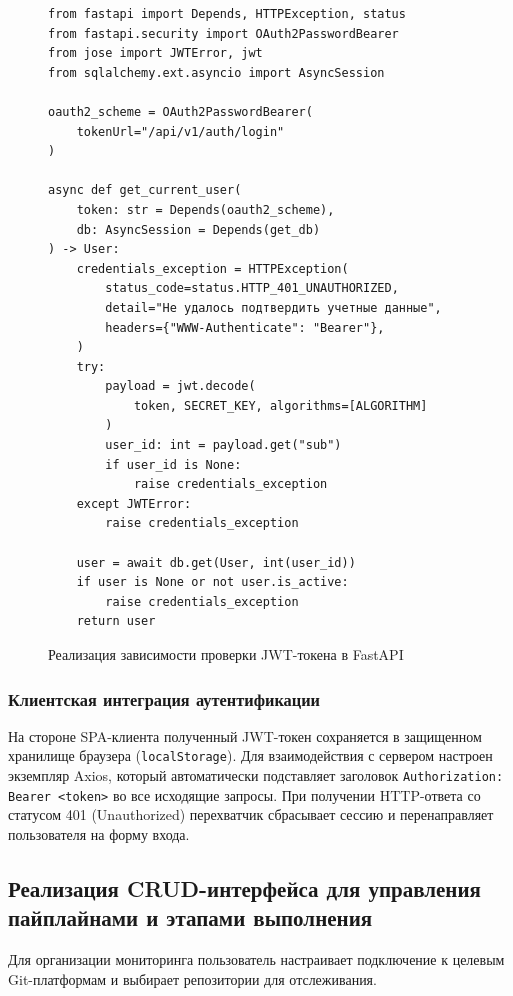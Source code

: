 \begin{figure}[H]
\centering
\begin{minipage}{0.95\textwidth}
\footnotesize
\begin{verbatim}
from fastapi import Depends, HTTPException, status
from fastapi.security import OAuth2PasswordBearer
from jose import JWTError, jwt
from sqlalchemy.ext.asyncio import AsyncSession

oauth2_scheme = OAuth2PasswordBearer(
    tokenUrl="/api/v1/auth/login"
)

async def get_current_user(
    token: str = Depends(oauth2_scheme),
    db: AsyncSession = Depends(get_db)
) -> User:
    credentials_exception = HTTPException(
        status_code=status.HTTP_401_UNAUTHORIZED,
        detail="Не удалось подтвердить учетные данные",
        headers={"WWW-Authenticate": "Bearer"},
    )
    try:
        payload = jwt.decode(
            token, SECRET_KEY, algorithms=[ALGORITHM]
        )
        user_id: int = payload.get("sub")
        if user_id is None:
            raise credentials_exception
    except JWTError:
        raise credentials_exception

    user = await db.get(User, int(user_id))
    if user is None or not user.is_active:
        raise credentials_exception
    return user
\end{verbatim}
\end{minipage}
\caption{Реализация зависимости проверки JWT-токена в FastAPI}
\label{lst:auth_dep}
\end{figure}

\subsubsection{Клиентская интеграция аутентификации}
На стороне SPA-клиента полученный JWT-токен сохраняется в защищенном хранилище браузера (\texttt{localStorage}). Для взаимодействия с сервером настроен экземпляр Axios, который автоматически подставляет заголовок \texttt{Authorization: Bearer <token>} во все исходящие запросы. При получении HTTP-ответа со статусом 401 (Unauthorized) перехватчик сбрасывает сессию и перенаправляет пользователя на форму входа.

\subsection{Реализация CRUD-интерфейса для управления пайплайнами и этапами выполнения}

Для организации мониторинга пользователь настраивает подключение к целевым Git-платформам и выбирает репозитории для отслеживания.

